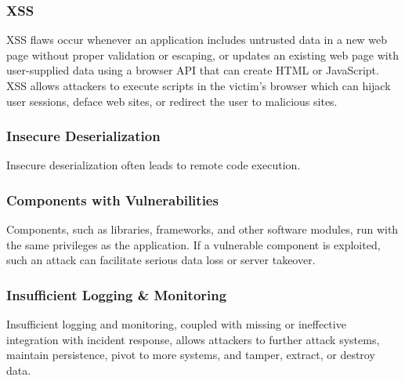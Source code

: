 \subsubsection{XSS}
XSS flaws occur whenever an application includes untrusted data in a new web page without proper validation or escaping, or updates an existing web page with user-supplied data using a browser API that can create HTML or JavaScript. XSS allows attackers to execute scripts in the victim’s browser which can hijack user sessions, deface web sites, or redirect the user to malicious sites.

\subsubsection{Insecure Deserialization}
Insecure deserialization often leads to remote code execution.

\subsubsection{Components with Vulnerabilities}
Components, such as libraries, frameworks, and other software modules, run with the same privileges as the application. If a vulnerable component is exploited, such an attack can facilitate serious data loss or server takeover.

\subsubsection{Insufficient Logging \& Monitoring}
Insufficient logging and monitoring, coupled with missing or ineffective integration with incident response, allows attackers to further attack systems, maintain persistence, pivot to more systems, and tamper, extract, or destroy data.
